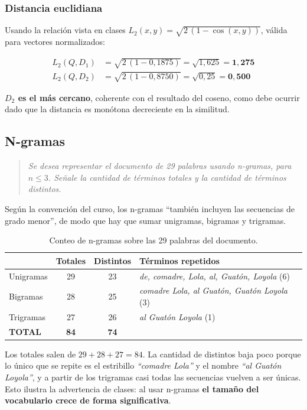 \documentclass[11pt, a4paper]{article}
\newenvironment{enunciado}
  {\begin{quote}\itshape\color{black!75}\small}
  {\end{quote}}
\begin{document}
\subsubsection{Distancia euclidiana}

Usando la relación vista en clases $L_2(x,y) = \sqrt{2\,(1 - \cos(x,y))}$, válida para vectores
normalizados:

\begin{align}
L_2(Q, D_1) &= \sqrt{2\,(1 - 0{,}1875)} = \sqrt{1{,}625} = \mathbf{1{,}275} \\
L_2(Q, D_2) &= \sqrt{2\,(1 - 0{,}8750)} = \sqrt{0{,}25} = \mathbf{0{,}500}
\end{align}

\textbf{$D_2$ es el más cercano}, coherente con el resultado del coseno, como debe ocurrir dado que
la distancia es monótona decreciente en la similitud.

\subsection{N-gramas}

\begin{enunciado}
Se desea representar el documento de 29 palabras usando n-gramas, para $n \leq 3$. Señale la cantidad
de términos totales y la cantidad de términos distintos.
\end{enunciado}

Según la convención del curso, los n-gramas ``también incluyen las secuencias de grado menor'', de
modo que hay que sumar unigramas, bigramas y trigramas.

\begin{table}[H]
\centering
\caption{Conteo de n-gramas sobre las 29 palabras del documento.}
\small
\begin{tabular}{@{}lccl@{}}
\toprule
& \textbf{Totales} & \textbf{Distintos} & \textbf{Términos repetidos} \\
\midrule
Unigramas & 29 & 23 & \textit{de, comadre, Lola, al, Guatón, Loyola} (6) \\
Bigramas  & 28 & 25 & \textit{comadre Lola, al Guatón, Guatón Loyola} (3) \\
Trigramas & 27 & 26 & \textit{al Guatón Loyola} (1) \\
\midrule
\textbf{TOTAL} & \textbf{84} & \textbf{74} & \\
\bottomrule
\end{tabular}
\end{table}

Los totales salen de $29 + 28 + 27 = 84$. La cantidad de distintos baja poco porque lo único que se
repite es el estribillo \textit{``comadre Lola''} y el nombre \textit{``al Guatón Loyola''}, y a
partir de los trigramas casi todas las secuencias vuelven a ser únicas. Esto ilustra la advertencia
de clases: al usar n-gramas \textbf{el tamaño del vocabulario crece de forma significativa}.
\end{document}
